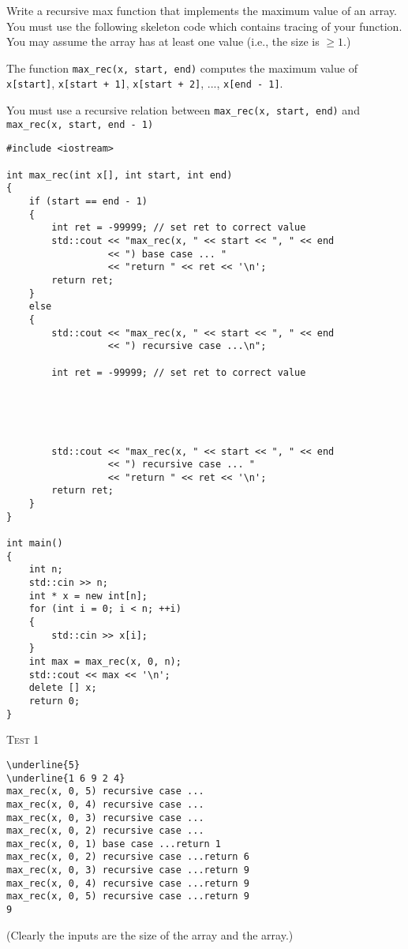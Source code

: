 Write a recursive max function that implements
the maximum value of an array.
You must use the following skeleton code which
contains tracing of your function.
You may assume the array has at least one value (i.e., the size is $\geq 1$.)

The function
\verb!max_rec(x, start, end)!
computes the maximum value of
\verb!x[start]!, 
\verb!x[start + 1]!, 
\verb!x[start + 2]!, ...,
\verb!x[end - 1]!.

You must use a recursive relation between
\verb!max_rec(x, start, end)!
and
\\
\verb!max_rec(x, start, end - 1)!

\begin{Verbatim}[frame=single, fontsize=\small]
#include <iostream>

int max_rec(int x[], int start, int end)
{
    if (start == end - 1)
    {
        int ret = -99999; // set ret to correct value
        std::cout << "max_rec(x, " << start << ", " << end
                  << ") base case ... "
                  << "return " << ret << '\n';
        return ret;
    }
    else
    {
        std::cout << "max_rec(x, " << start << ", " << end
                  << ") recursive case ...\n";

        int ret = -99999; // set ret to correct value





        std::cout << "max_rec(x, " << start << ", " << end 
                  << ") recursive case ... "
                  << "return " << ret << '\n';
        return ret;        
    }
}

int main()
{
    int n;
    std::cin >> n;
    int * x = new int[n];
    for (int i = 0; i < n; ++i)
    {
        std::cin >> x[i];
    }
    int max = max_rec(x, 0, n);
    std::cout << max << '\n';
    delete [] x;
    return 0;
}
\end{Verbatim}

\textsc{Test 1}
\begin{Verbatim}[commandchars=\\\{\}, fontsize=\small, frame=single]
\underline{5}
\underline{1 6 9 2 4}
max_rec(x, 0, 5) recursive case ...
max_rec(x, 0, 4) recursive case ...
max_rec(x, 0, 3) recursive case ...
max_rec(x, 0, 2) recursive case ...
max_rec(x, 0, 1) base case ...return 1
max_rec(x, 0, 2) recursive case ...return 6
max_rec(x, 0, 3) recursive case ...return 9
max_rec(x, 0, 4) recursive case ...return 9
max_rec(x, 0, 5) recursive case ...return 9
9
\end{Verbatim}
(Clearly the inputs are the size of the array and the array.)

